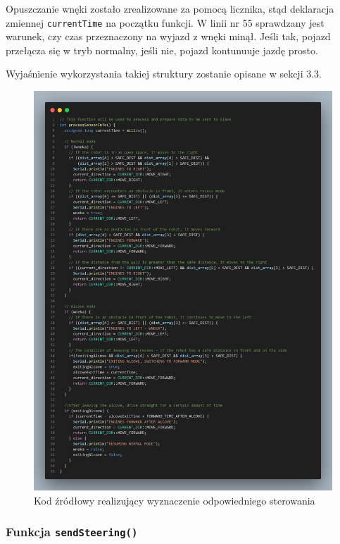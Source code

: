 \documentclass{report}
\begin{document}
Opuszczanie wnęki zostało zrealizowane za pomocą licznika, stąd deklaracja zmiennej \texttt{currentTime} na początku funkcji. W linii nr 55 sprawdzany jest warunek, czy czas przeznaczony na wyjazd z wnęki minął. Jeśli tak, pojazd przełącza się w tryb normalny, jeśli nie, pojazd kontunuuje jazdę prosto. 

Wyjaśnienie wykorzystania takiej struktury zostanie opisane w sekcji 3.3. 

\begin{figure}[H]
    \centering
    \includegraphics[width=1.0\textwidth]{src/code_snaps/processInfo.png}
    \caption{Kod źródłowy realizujący wyznaczenie odpowiedniego sterowania}
\end{figure}

\newpage

\subsubsection*{Funkcja \texttt{sendSteering()}}
\end{document}

